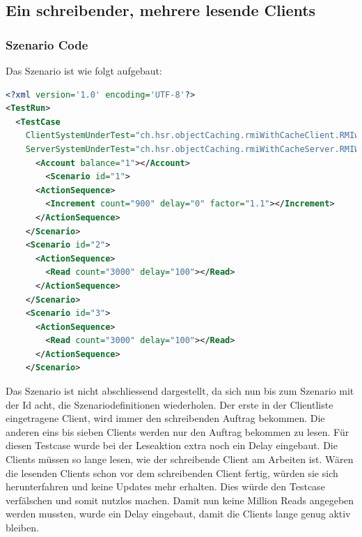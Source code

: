 \subsection{Ein schreibender, mehrere lesende Clients}
\subsubsection{Szenario Code}
Das Szenario ist wie folgt aufgebaut:
\begin{lstlisting}[language=XML, breaklines=true]
<?xml version='1.0' encoding='UTF-8'?>
<TestRun>
  <TestCase
    ClientSystemUnderTest="ch.hsr.objectCaching.rmiWithCacheClient.RMIwithCacheClientSystem"
    ServerSystemUnderTest="ch.hsr.objectCaching.rmiWithCacheServer.RMIWithCacheServerSystem">
      <Account balance="1"></Account>
        <Scenario id="1">
	  <ActionSequence>
	    <Increment count="900" delay="0" factor="1.1"></Increment>
	  </ActionSequence>
	</Scenario>
	<Scenario id="2">
	  <ActionSequence>
	    <Read count="3000" delay="100"></Read>
	  </ActionSequence>
	</Scenario>
	<Scenario id="3">
	  <ActionSequence>
	    <Read count="3000" delay="100"></Read>
	  </ActionSequence>
	</Scenario>
\end{lstlisting}

Das Szenario ist nicht abschliessend dargestellt, da sich nun bis zum Szenario mit der Id acht, die Szenariodefinitionen wiederholen. Der erste in der Clientliste eingetragene Client, wird immer den schreibenden Auftrag bekommen. Die anderen eins bis sieben Clients werden nur den Auftrag bekommen zu lesen. \newline
Für diesen Testcase wurde bei der Leseaktion extra noch ein Delay eingebaut. Die Clients müssen so lange lesen, wie der schreibende Client am Arbeiten ist. Wären die lesenden Clients schon vor dem schreibenden Client fertig, würden sie sich herunterfahren und keine Updates mehr erhalten. Dies würde den Testcase verfälschen und somit nutzlos machen. Damit nun keine Million Reads angegeben werden mussten, wurde ein Delay eingebaut, damit die Clients lange genug aktiv bleiben. 
